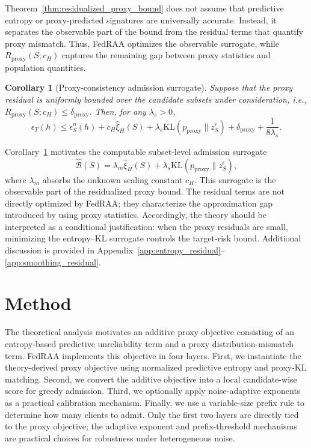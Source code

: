 \documentclass[conference]{IEEEtran}
\newtheorem{corollary}{Corollary}
\theoremstyle{definition}
\theoremstyle{remark}
\begin{document}
Theorem~\ref{thm:residualized_proxy_bound} does not assume that predictive entropy or proxy-predicted signatures are universally accurate.
Instead, it separates the observable part of the bound from the residual terms that quantify proxy mismatch.
Thus, FedRAA optimizes the observable surrogate, while $R_{\mathrm{proxy}}(S;c_H)$ captures the remaining gap between proxy statistics and population quantities.

\begin{corollary}[Proxy-consistency admission surrogate]
\label{cor:proxy_consistency_surrogate}
Suppose that the proxy residual is uniformly bounded over the candidate subsets under consideration, i.e.,
$R_{\mathrm{proxy}}(S;c_H)\le \delta_{\mathrm{proxy}}$.
Then, for any $\lambda_s>0$,
\begin{equation}
\label{eq:proxy_consistency_bound}
\epsilon_T(h)
\le
\epsilon_S^n(h)
+
c_H\widehat{\xi}_{H}(S)
+
\lambda_s
\mathrm{KL}
\left(
p_{\mathrm{proxy}}\|z_S^\epsilon
\right)
+
\delta_{\mathrm{proxy}}
+
\frac{1}{8\lambda_s}.
\end{equation}
\end{corollary}

Corollary~\ref{cor:proxy_consistency_surrogate} motivates the computable subset-level admission surrogate
\begin{equation}
\label{eq:proxy_surrogate_objective}
\widehat{\mathcal B}(S)
=
\lambda_m\widehat{\xi}_{H}(S)
+
\lambda_s
\mathrm{KL}
\left(
p_{\mathrm{proxy}}\|z_S^\epsilon
\right),
\end{equation}
where $\lambda_m$ absorbs the unknown scaling constant $c_H$.
This surrogate is the observable part of the residualized proxy bound.
The residual terms are not directly optimized by FedRAA; they characterize the approximation gap introduced by using proxy statistics.
Accordingly, the theory should be interpreted as a conditional justification: when the proxy residuals are small, minimizing the entropy--KL surrogate controls the target-risk bound. Additional discussion is provided in Appendix~\ref{app:entropy_residual}--\ref{app:smoothing_residual}.

\section{Method}
\label{sec:method}

The theoretical analysis motivates an additive proxy objective consisting of an entropy-based predictive unreliability term and a proxy distribution-mismatch term.
FedRAA implements this objective in four layers.
First, we instantiate the theory-derived proxy objective using normalized predictive entropy and proxy-KL matching.
Second, we convert the additive objective into a local candidate-wise score for greedy admission.
Third, we optionally apply noise-adaptive exponents as a practical calibration mechanism.
Finally, we use a variable-size prefix rule to determine how many clients to admit.
Only the first two layers are directly tied to the proxy objective; the adaptive exponent and prefix-threshold mechanisms are practical choices for robustness under heterogeneous noise.
\end{document}

